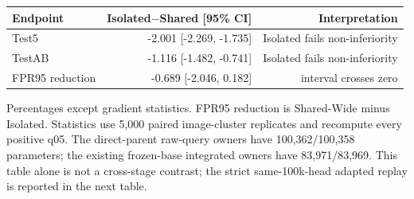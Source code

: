 \begin{table}[t]
\begin{tabular}{lrr}
\toprule
Endpoint & Isolated$-$Shared [95\% CI] & Interpretation\\
\midrule
Test5 & -2.001 [-2.269, -1.735] & Isolated fails non-inferiority\\
TestAB & -1.116 [-1.482, -0.741] & Isolated fails non-inferiority\\
FPR95 reduction & -0.689 [-2.046, 0.182] & interval crosses zero\\
\bottomrule
\end{tabular}
\parbox{0.98\textwidth}{\scriptsize Percentages except gradient statistics.
FPR95 reduction is Shared-Wide minus Isolated. Statistics use 5,000 paired image-cluster
replicates and recompute every positive q05. The direct-parent raw-query owners
have 100,362/100,358 parameters; the existing frozen-base integrated owners have
83,971/83,969.  This table alone is not a cross-stage contrast; the strict
same-100k-head adapted replay is reported in the next table.}
\end{table}

